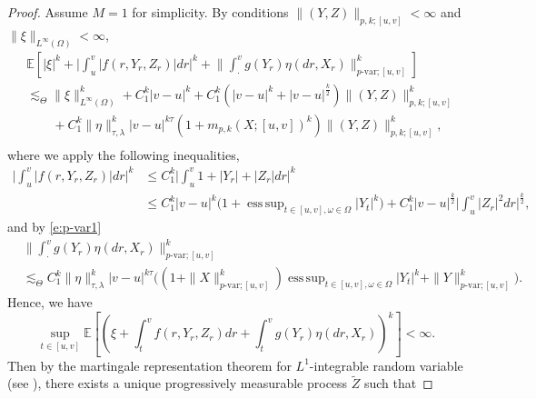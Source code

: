 \documentclass[11pt,reqno]{amsart}
\def\E{\mathbb E}
\DeclareMathOperator*{\esssup}{ess\,sup}
\numberwithin{equation}{section}
\begin{document}
\begin{proof}
Assume $M=1$ for simplicity. By conditions $\|(Y,Z)\|_{p,k;[u,v]}<\infty$ and $\|\xi\|_{L^{\infty}(\Omega)}<\infty$,  
\begin{equation*}
\begin{aligned}
&\mathbb{E} \left[ \left|\xi\right|^{k} + \Big|\int_{u}^{v} |f(r,Y_{r},Z_{r})| dr\Big|^{k} + \Big\|\int_{\cdot}^{v}g(Y_{r})\eta(dr,X_{r})\Big\|^k_{p\text{-var};[u,v]} \right]\\
&\lesssim_{\Theta} \|\xi\|^{k}_{L^{\infty}(\Omega)} + C^{k}_{1}|v-u|^{k} + C^{k}_{1}(|v-u|^{k} + |v-u|^{\frac{k}{2}}) \|(Y,Z)\|^{k}_{p,k;[u,v]} \\[1mm]
&\quad\quad + C^{k}_{1}\|\eta\|^{k}_{\tau,\lambda}|v-u|^{k\tau}(1+m_{p,k}(X;[u,v])^{k})\|(Y,Z)\|^{k}_{p,k;[u,v]},\\
\end{aligned}
\end{equation*}
where we apply the following inequalities,
\begin{equation*}
\begin{aligned}							
\Big|\int_{u}^{v}|f(r,Y_{r},Z_{r})|dr\Big|^{k}&\le C^{k}_{1}\Big|\int_{u}^{v}1+|Y_{r}|+|Z_{r}|dr\Big|^{k}\\
&\le C^{k}_{1}|v-u|^{k}\Big(1+\esssup_{t\in[u,v],\omega\in\Omega}|Y_{t}|^{k}\Big) + C^{k}_{1}|v-u|^{\frac{k}{2}} \Big|\int_{u}^{v}|Z_{r}|^{2}dr\Big|^{\frac{k}{2}},
\end{aligned}
\end{equation*}
and by \eqref{e:p-var1}
\begin{equation*}
\begin{aligned}
&\Big\|\int_{\cdot}^{v}g(Y_{r})\eta(dr,X_{r})\Big\|_{p\text{-var};[u,v]}^{k}\\
&\lesssim_{\Theta} C^{k}_{1}\|\eta\|^{k}_{\tau,\lambda}|v-u|^{k\tau}\Big((1+\|X\|^{k}_{p\text{-var};[u,v]})\esssup_{t\in[u,v], \omega\in\Omega}|Y_{t}|^{k} + \|Y\|^{k}_{p\text{-var};[u,v]}\Big).
\end{aligned}
\end{equation*}
Hence, we have
\begin{equation}\label{e:k moments of Y}
\sup_{t\in[u,v]}\E\left[\left(\xi + \int_{t}^{v}f(r,Y_{r},Z_{r})dr + \int_{t}^{v}g(Y_{r})\eta(dr,X_{r})\right)^k\right]<\infty.
\end{equation}
Then by  the martingale representation theorem for $L^1$-integrable random variable (see \cite[Theorem~3]{clark1970representation}), there exists a unique  progressively measurable
process $\tilde{Z}$ such that 

\end{proof}
\end{document}
